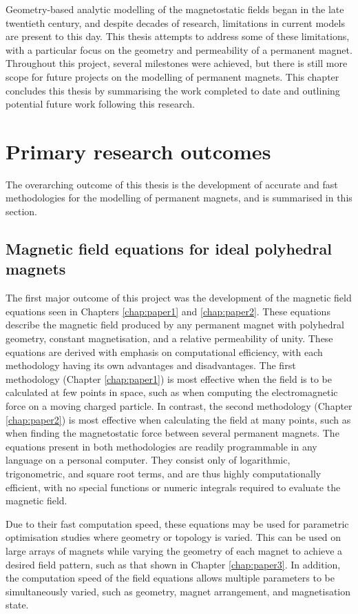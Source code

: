 
Geometry-based analytic modelling of the magnetostatic fields began in the late twentieth century, and despite decades of research, limitations in current models are present to this day. This thesis attempts to address some of these limitations, with a particular focus on the geometry and permeability of a permanent magnet. Throughout this project, several milestones were achieved, but there is still more scope for future projects on the modelling of permanent magnets. This chapter concludes this thesis by summarising the work completed to date and outlining potential future work following this research.

\section{Primary research outcomes}
The overarching outcome of this thesis is the development of accurate and fast methodologies for the modelling of permanent magnets, and is summarised in this section.

\subsection{Magnetic field equations for ideal polyhedral magnets}
The first major outcome of this project was the development of the magnetic field equations seen in Chapters \ref{chap:paper1} and \ref{chap:paper2}. These equations describe the magnetic field produced by any permanent magnet with polyhedral geometry, constant magnetisation, and a relative permeability of unity. These equations are derived with emphasis on computational efficiency, with each methodology having its own advantages and disadvantages. The first methodology (Chapter \ref{chap:paper1}) is most effective when the field is to be calculated at few points in space, such as when computing the electromagnetic force on a moving charged particle. In contrast, the second methodology (Chapter \ref{chap:paper2}) is most effective when calculating the field at many points, such as when finding the magnetostatic force between several permanent magnets. The equations present in both methodologies are readily programmable in any language on a personal computer. They consist only of logarithmic, trigonometric, and square root terms, and are thus highly computationally efficient, with no special functions or numeric integrals required to evaluate the magnetic field.

Due to their fast computation speed, these equations may be used for parametric optimisation studies where geometry or topology is varied. This can be used on large arrays of magnets while varying the geometry of each magnet to achieve a desired field pattern, such as that shown in Chapter \ref{chap:paper3}. In addition, the computation speed of the field equations allows multiple parameters to be simultaneously varied, such as geometry, magnet arrangement, and magnetisation state.

